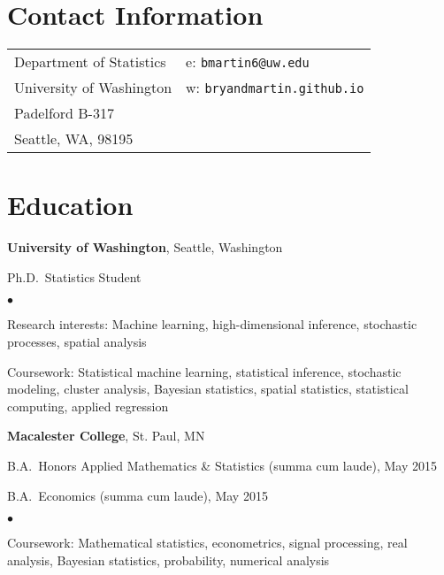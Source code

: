 \documentclass[margin,centered]{res}
\newenvironment{list1}{
  \begin{list}{\ding{113}}{%
      \setlength{\itemsep}{0in}
      \setlength{\parsep}{0in} \setlength{\parskip}{0in}
      \setlength{\topsep}{0in} \setlength{\partopsep}{0in}
      \setlength{\leftmargin}{0.17in}}}{\end{list}}
\newenvironment{list2}{
  \begin{list}{$\bullet$}{%
      \setlength{\itemsep}{0in}
      \setlength{\parsep}{0in} \setlength{\parskip}{0in}
      \setlength{\topsep}{0in} \setlength{\partopsep}{0in}
      \setlength{\leftmargin}{0.2in}}}{\end{list}}
\begin{document}
\vspace*{.1in}


\begin{resume}

\section{\sc Contact Information}

\vspace{.05in}
\begin{tabular}{@{}p{2.0in}p{2in}}
Department of Statistics& e:  \verb+bmartin6@uw.edu+ \\
University of Washington  &w: \verb+bryandmartin.github.io+ 
\\
Padelford B-317		                   	   \\
Seattle, WA, 98195             & \\






\end{tabular}

\section{\sc Education}
{\bf University of Washington}, Seattle, Washington
\begin{list1}
\item[] 
Ph.D.~Statistics Student
\begin{list2}
\vspace*{.05in}
\item Research interests: Machine learning, high-dimensional inference, stochastic processes, spatial analysis
\item Coursework: Statistical machine learning, statistical inference, stochastic modeling, cluster analysis, Bayesian statistics, spatial statistics, statistical computing, applied regression
\end{list2}
\end{list1}



{\bf Macalester College}, St. Paul, MN
\begin{list1}
\item[] B.A.~Honors Applied Mathematics \& Statistics (summa cum laude), May 2015
\item[] B.A.~Economics (summa cum laude), May 2015
\begin{list2}
\vspace*{.05in}
\item Coursework: Mathematical statistics, econometrics, signal processing, real analysis, Bayesian statistics, probability, numerical analysis
\end{list2}
\end{list1}



\end{resume}
\end{document}
